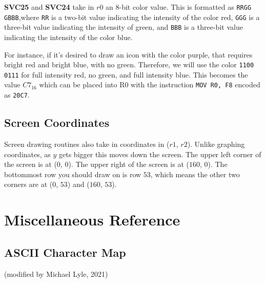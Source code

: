 \documentclass[12pt]{article}
\newcommand{\reg}[1]{$r#1$}
\begin{document}
\textbf{SVC25} and \textbf{SVC24} take in \reg{0} an 8-bit color value.  This is formatted as \texttt{RRGG GBBB},where \texttt{RR} is a two-bit value indicating the intensity of the color red, \texttt{GGG} is a three-bit value indicating the intensity of green, and \texttt{BBB} is a three-bit value indicating the intensity of the color blue.

For instance, if it's desired to draw an icon with the color purple, that requires bright red and bright blue, with no green.  Therefore, we will use the color \texttt{1100 0111} for full intensity red, no green, and full intensity blue.  This becomes the value $C7_{16}$ which can be placed into R0 with the instruction \texttt{MOV R0, F8} encoded as \texttt{20C7}.

\subsection{Screen Coordinates}

Screen drawing routines also take in coordinates in (\reg{1}, \reg{2}).  Unlike graphing coordinates, as $y$ gets bigger this moves down the screen.  The upper left corner of the screen is at ($0$, $0$).  The upper right of the screen is at ($160$, $0$).  The bottommost row you should draw on is row $53$, which means the other two corners are at ($0$, $53$) and ($160$, $53$).

\section{Miscellaneous Reference}
\subsection{ASCII Character Map}
\begin{center}

(modified by Michael Lyle, 2021)
\end{center}

\newpage
\end{document}
